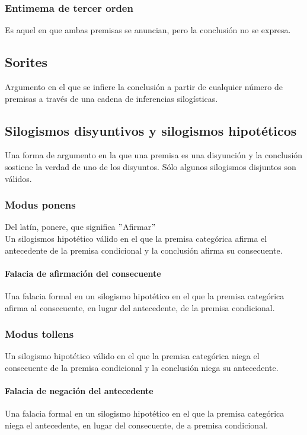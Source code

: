 \documentclass[10pt]{book} 						%
\begin{document}
\subsubsection{Entimema de tercer orden}
Es aquel en que ambas premisas se anuncian, pero la conclusión no se expresa.
\subsection{Sorites}
Argumento en el que se infiere la conclusión a partir de cualquier número de premisas a través de una cadena de inferencias silogísticas.
\subsection{Silogismos disyuntivos y silogismos hipotéticos}
Una forma de argumento en la que una premisa es una disyunción y la conclusión sostiene la verdad de uno de los disyuntos. Sólo algunos silogismos disjuntos son válidos.
\subsubsection{Modus ponens}
Del latín, ponere, que significa $"$Afirmar$"$\\
Un silogismos hipotético válido en el que la premisa categórica afirma el antecedente de la premisa condicional y la conclusión afirma su consecuente.
\paragraph{Falacia de afirmación del consecuente} Una falacia formal en un silogismo hipotético en el que la premisa categórica afirma al consecuente, en lugar del antecedente, de la premisa condicional.
\subsubsection{Modus tollens}
Un silogismo hipotético válido en el que la premisa categórica niega el consecuente de la premisa condicional y la conclusión niega su antecedente.
\paragraph{Falacia de negación del antecedente} Una falacia formal en un silogismo hipotético en el que la premisa categórica niega el antecedente, en lugar del consecuente, de a premisa condicional.
\end{document}
